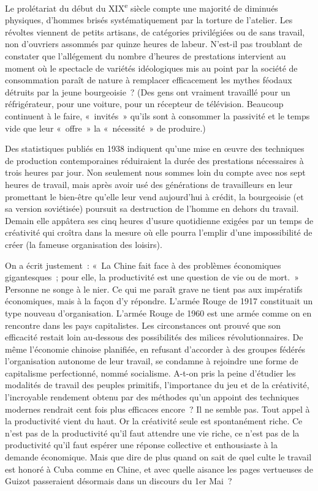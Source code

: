 \documentclass[french,twoside]{book} %
\begin{document}
Le prolétariat du début du XIX\textsuperscript{e} siècle compte une majorité de diminués physiques, d’hommes brisés systématiquement par la torture de l’atelier. Les révoltes viennent de petits artisans, de catégories privilégiées ou de sans travail, non d’ouvriers assommés par quinze heures de labeur. N’est-il pas troublant de constater que l’allégement du nombre d’heures de prestations intervient au moment où le spectacle de variétés idéologiques mis au point par la société de consommation paraît de nature à remplacer efficacement les mythes féodaux détruits par la jeune bourgeoisie ? (Des gens ont vraiment travaillé pour un réfrigérateur, pour une voiture, pour un récepteur de télévision. Beaucoup continuent à le faire, « invités » qu’ils sont à consommer la passivité et le temps vide que leur « offre » la « nécessité » de produire.)\par
Des statistiques publiés en 1938 indiquent qu’une mise en œuvre des techniques de production contemporaines réduiraient la durée des prestations nécessaires à trois heures par jour. Non seulement nous sommes loin du compte avec nos sept heures de travail, mais après avoir usé des générations de travailleurs en leur promettant le bien-être qu’elle leur vend aujourd’hui à crédit, la bourgeoisie (et sa version soviétisée) poursuit sa destruction de l’homme en dehors du travail. Demain elle appâtera ses cinq heures d’usure quotidienne exigées par un temps de créativité qui croîtra dans la mesure où elle pourra l’emplir d’une impossibilité de créer (la fameuse organisation des loisirs).\par
On a écrit justement : « La Chine fait face à des problèmes économiques gigantesques ; pour elle, la productivité est une question de vie ou de mort. » Personne ne songe à le nier. Ce qui me paraît grave ne tient pas aux impératifs économiques, mais à la façon d’y répondre. L’armée Rouge de 1917 constituait un type nouveau d’organisation. L’armée Rouge de 1960 est une armée comme on en rencontre dans les pays capitalistes. Les circonstances ont prouvé que son efficacité restait loin au-dessous des possibilités des milices révolutionnaires. De même l’économie chinoise planifiée, en refusant d’accorder à des groupes fédérés l’organisation autonome de leur travail, se condamne à rejoindre une forme de capitalisme perfectionné, nommé socialisme. A-t-on pris la peine d’étudier les modalités de travail des peuples primitifs, l’importance du jeu et de la créativité, l’incroyable rendement obtenu par des méthodes qu’un appoint des techniques modernes rendrait cent fois plus efficaces encore ? Il ne semble pas. Tout appel à la productivité vient du haut. Or la créativité seule est spontanément riche. Ce n’est pas de la productivité qu’il faut attendre une vie riche, ce n’est pas de la productivité qu’il faut espérer une réponse collective et enthousiaste à la demande économique. Mais que dire de plus quand on sait de quel culte le travail est honoré à Cuba comme en Chine, et avec quelle aisance les pages vertueuses de Guizot passeraient désormais dans un discours du 1er Mai ?\par
\end{document}
